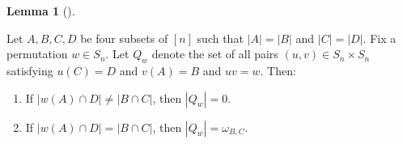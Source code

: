 \documentclass[numbers=enddot,12pt,final,onecolumn,notitlepage]{scrartcl}%
\numberwithin{exer}{subsection}
\theoremstyle{definition}
\newtheorem{lem}[theo]{Lemma}
\newenvironment{lemma}[1][]
{\begin{lem}[#1]\begin{leftbar}}
{\end{leftbar}\end{lem}}
\begin{document}
\begin{lemma}
\label{lem.Nabla.prod0.a}Let $A,B,C,D$ be four subsets of $\left[  n\right]  $
such that $\left\vert A\right\vert =\left\vert B\right\vert $ and $\left\vert
C\right\vert =\left\vert D\right\vert $. Fix a permutation $w\in S_{n}$. Let
$Q_{w}$ denote the set of all pairs $\left(  u,v\right)  \in S_{n}\times
S_{n}$ satisfying $u\left(  C\right)  =D$ and $v\left(  A\right)  =B$ and
$uv=w$. Then:

\begin{enumerate}
\item[\textbf{(a)}] If $\left\vert w\left(  A\right)  \cap D\right\vert
\neq\left\vert B\cap C\right\vert $, then $\left\vert Q_{w}\right\vert =0$.

\item[\textbf{(b)}] If $\left\vert w\left(  A\right)  \cap D\right\vert
=\left\vert B\cap C\right\vert $, then $\left\vert Q_{w}\right\vert
=\omega_{B,C}$.
\end{enumerate}
\end{lemma}
\end{document}
